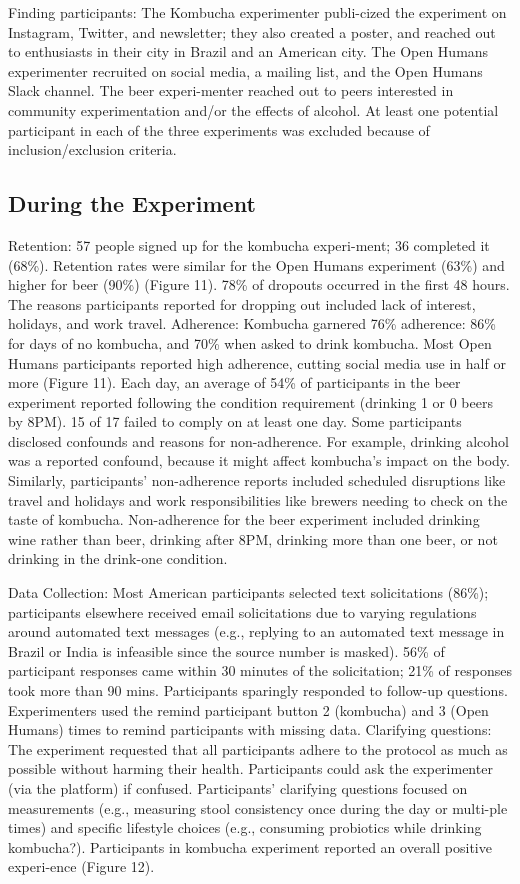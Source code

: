 Finding participants: The Kombucha experimenter publi-cized the experiment on Instagram, Twitter, and newsletter; they also created a poster, and reached out to enthusiasts in their city in Brazil and an American city. The Open Humans experimenter recruited on social media, a mailing list, and the Open Humans Slack channel. The beer experi-menter reached out to peers interested in community experimentation and/or the effects of alcohol. At least one potential participant in each of the three experiments was excluded because of inclusion/exclusion criteria. 

\subsection{During the Experiment}
Retention: 57 people signed up for the kombucha experi-ment; 36 completed it (68\%). Retention rates were similar for the Open Humans experiment (63\%) and higher for beer (90\%) (Figure 11). 78\% of dropouts occurred in the first 48 hours. The reasons participants reported for dropping out included lack of interest, holidays, and work travel.
Adherence: Kombucha garnered 76\% adherence: 86\% for days of no kombucha, and 70\% when asked to drink kombucha. Most Open Humans participants reported high adherence, cutting social media use in half or more (Figure 11). Each day, an average of 54\% of participants in the beer experiment reported following the condition requirement (drinking 1 or 0 beers by 8PM). 15 of 17 failed to comply on at least one day.
Some participants disclosed confounds and reasons for non-adherence. For example, drinking alcohol was a reported confound, because it might affect kombucha’s impact on the body. Similarly, participants’ non-adherence reports included scheduled disruptions like travel and holidays and work responsibilities like brewers needing to check on the taste of kombucha. Non-adherence for the beer experiment included drinking wine rather than beer, drinking after 8PM, drinking more than one beer, or not drinking in the drink-one condition.

Data Collection: Most American participants selected text solicitations (86\%); participants elsewhere received email solicitations due to varying regulations around automated text messages (e.g., replying to an automated text message in Brazil or India is infeasible since the source number is masked). 56\% of participant responses came within 30 minutes of the solicitation; 21\% of responses took more than 90 mins. Participants sparingly responded to follow-up questions. Experimenters used the remind participant button 2 (kombucha) and 3 (Open Humans) times to remind participants with missing data.
Clarifying questions: The experiment requested that all participants adhere to the protocol as much as possible without harming their health. Participants could ask the experimenter (via the platform) if confused. Participants’ clarifying questions focused on measurements (e.g., measuring stool consistency once during the day or multi-ple times) and specific lifestyle choices (e.g., consuming probiotics while drinking kombucha?). Participants in kombucha experiment reported an overall positive experi-ence (Figure 12).

